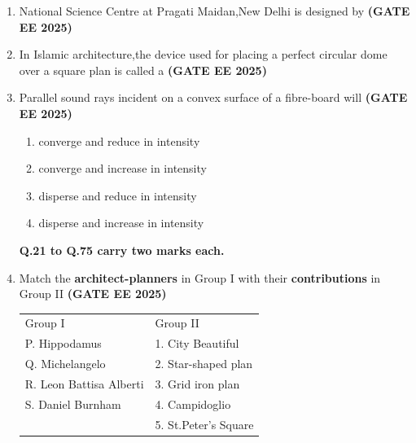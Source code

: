 \documentclass[journal,12pt,onecolumn]{IEEEtran}
\theoremstyle{remark}
\begin{document}
\begin{enumerate}
\item  National Science Centre at Pragati Maidan,New Delhi is designed by \hfill \textbf{(GATE EE 2025)}
\begin{enumerate}
\end{enumerate}
\item  In Islamic architecture,the device used for placing a perfect circular dome over a square plan is called a \hfill \textbf{(GATE EE 2025)}
\begin{enumerate}
\end{enumerate}
\item  Parallel sound rays incident on a convex surface of a fibre-board will \hfill \textbf{(GATE EE 2025)}
\begin{enumerate}
    \item converge and reduce in intensity
    \item converge and increase in intensity
    \item disperse and reduce in intensity
    \item disperse and increase in intensity
\end{enumerate}
\begin{center}
\textbf{Q.21 to Q.75 carry two marks each.}
\end{center}
\item  Match the \textbf{architect-planners} in Group I with their \textbf{contributions} in Group II \hfill \textbf{(GATE EE 2025)}
\newline
\begin{tabular}{p{}p{}}
Group I & Group II\\ 
P. Hippodamus & 1. City Beautiful\\
Q. Michelangelo & 2. Star-shaped plan\\
R. Leon Battisa Alberti & 3. Grid iron plan\\
S. Daniel Burnham & 4. Campidoglio\\
  & 5. St.Peter's Square\\


\end{tabular}
\end{enumerate}
\end{document}
